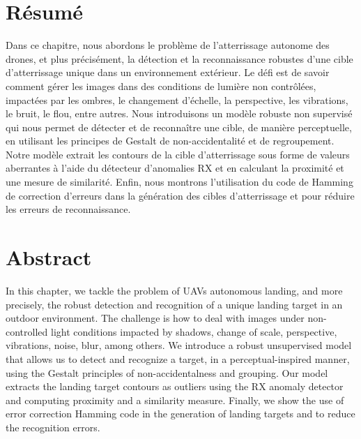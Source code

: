 %

\section*{Résumé}
\noindent Dans ce chapitre, nous abordons le problème de l'atterrissage autonome des drones, et plus précisément, la détection et la reconnaissance robustes d'une cible d'atterrissage unique dans un environnement extérieur. Le défi est de savoir comment gérer les images dans des conditions de lumière non contrôlées, impactées par les ombres, le changement d'échelle, la perspective, les vibrations, le bruit, le flou, entre autres. Nous introduisons un modèle robuste non supervisé qui nous permet de détecter et de reconnaître une cible, de manière perceptuelle, en utilisant les principes de Gestalt de non-accidentalité et de regroupement. Notre modèle extrait les contours de la cible d'atterrissage sous forme de valeurs aberrantes à l'aide du détecteur d'anomalies RX et en calculant la proximité et une mesure de similarité. Enfin, nous montrons l'utilisation du code de Hamming de correction d'erreurs dans la génération des cibles d'atterrissage et pour réduire les erreurs de reconnaissance.

\section*{Abstract}
\noindent In this chapter, we tackle the problem of UAVs autonomous landing, and more precisely, the robust detection and recognition of a unique landing target in an outdoor environment. The challenge is how to deal with images under non-controlled light conditions impacted by shadows, change of scale, perspective, vibrations, noise, blur, among others. We introduce a robust unsupervised model that allows us to detect and recognize a target, in a perceptual-inspired manner, using the Gestalt principles of non-accidentalness and grouping.  Our model extracts the landing target contours as outliers using the RX anomaly detector and computing proximity and a similarity measure.  Finally, we show the use of error correction Hamming code in the generation of landing targets and to reduce the recognition errors. 


